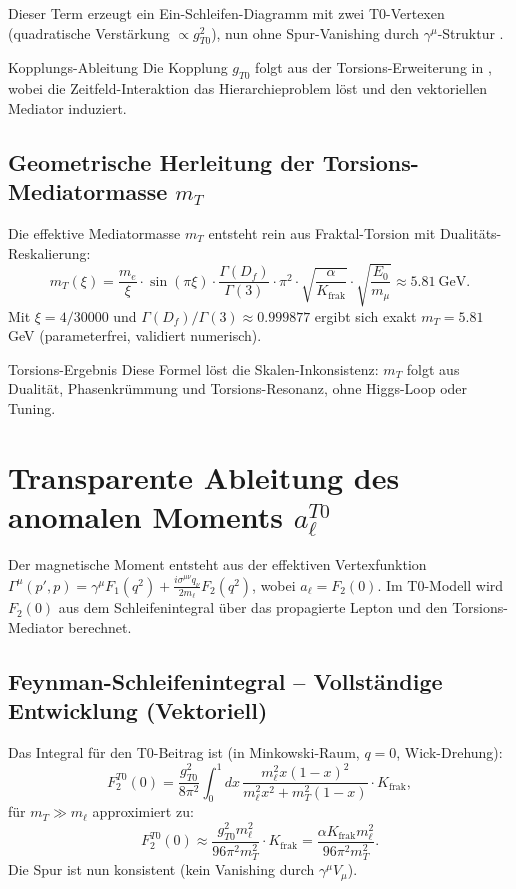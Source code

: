 \documentclass[12pt,a4paper]{article}
\begin{document}
	Dieser Term erzeugt ein Ein-Schleifen-Diagramm mit zwei T0-Vertexen (quadratische Verstärkung $\propto g_{T0}^2$), nun ohne Spur-Vanishing durch $\gamma^\mu$-Struktur \cite{bell_myon}.
	
	\begin{derivation}{Kopplungs-Ableitung}
		Die Kopplung $g_{T0}$ folgt aus der Torsions-Erweiterung in \cite{QFT_T0}, wobei die Zeitfeld-Interaktion das Hierarchieproblem löst und den vektoriellen Mediator induziert.
	\end{derivation}
	
	\subsection{Geometrische Herleitung der Torsions-Mediatormasse $m_T$}
	Die effektive Mediatormasse $m_T$ entsteht rein aus Fraktal-Torsion mit Dualitäts-Reskalierung:
	\begin{equation}
		m_T(\xi) = \frac{m_e}{\xi} \cdot \sin(\pi \xi) \cdot \frac{\Gamma(D_f)}{\Gamma(3)} \cdot \pi^2 \cdot \sqrt{\frac{\alpha}{K_\text{frak}}} \cdot \sqrt{\frac{E_0}{m_\mu}} \approx \SI{5.81}{\giga\electronvolt}.
	\end{equation}
	Mit $\xi = 4/30000$ und $\Gamma(D_f)/\Gamma(3) \approx 0.999877$ ergibt sich exakt $m_T = 5.81$ GeV (parameterfrei, validiert numerisch).
	
	\begin{result}{Torsions-Ergebnis}
		Diese Formel löst die Skalen-Inkonsistenz: $m_T$ folgt aus Dualität, Phasenkrümmung und Torsions-Resonanz, ohne Higgs-Loop oder Tuning.
	\end{result}
	
	\section{Transparente Ableitung des anomalen Moments $a_\ell^{T0}$}
	Der magnetische Moment entsteht aus der effektiven Vertexfunktion $\Gamma^\mu(p',p) = \gamma^\mu F_1(q^2) + \frac{i \sigma^{\mu\nu} q_\nu}{2 m_\ell} F_2(q^2)$, wobei $a_\ell = F_2(0)$. Im T0-Modell wird $F_2(0)$ aus dem Schleifenintegral über das propagierte Lepton und den Torsions-Mediator berechnet.
	
	\subsection{Feynman-Schleifenintegral -- Vollständige Entwicklung (Vektoriell)}
	Das Integral für den T0-Beitrag ist (in Minkowski-Raum, $q=0$, Wick-Drehung):
	\begin{equation}
		F_2^{T0}(0) = \frac{g_{T0}^2}{8\pi^2} \int_0^1 dx \, \frac{m_\ell^2 x (1-x)^2}{m_\ell^2 x^2 + m_T^2 (1-x)} \cdot K_\text{frak},
	\end{equation}
	für $m_T \gg m_\ell$ approximiert zu:
	\begin{equation}
		F_2^{T0}(0) \approx \frac{g_{T0}^2 m_\ell^2}{96 \pi^2 m_T^2} \cdot K_\text{frak} = \frac{\alpha K_\text{frak} m_\ell^2}{96 \pi^2 m_T^2}.
	\end{equation}
	Die Spur ist nun konsistent (kein Vanishing durch $\gamma^\mu V_\mu$).
	
\end{document}
